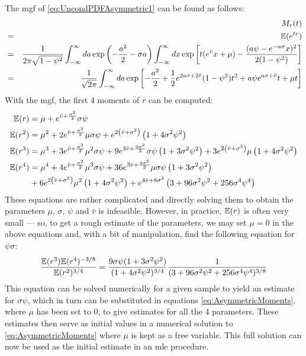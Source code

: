 The \gls{mgf} of \ref{eq:UncondPDFAsymmetric1} can be found as follows:
\begin{eqnarray*}
  && M_{r}(t) \\
  &=& \mathbb{E}(e^{tr}) \\
  &=& {1 \over 2\pi \sqrt{1 - \psi^2}} \int_{-\infty}^{\infty} da \exp \left(
    -{a^2 \over 2} - \sigma a
  \right) \int_{-\infty}^{\infty} dx \exp\left[
    t(e^{\bar{v}}x + \mu) - {
      (a\psi - e^{-a \sigma} x)^2 \over 2 (1 - \psi^2)
    }
  \right] \\
  &=& {1 \over \sqrt{2 \pi}} \int_{-\infty}^{\infty} da \exp\left[
    -{a^2 \over 2} + {1 \over 2} e^{2 a \sigma + 2\bar{v}} (1 - \psi^2) t^2 +
    a \psi e^{a \sigma + \bar{v}} t + \mu t
  \right]
\end{eqnarray*}
With the \gls{mgf}, the first 4 moments of $r$ can be computed:
\begin{equation}
  \label{eq:AsymmetricMoments}
  \begin{aligned}
    \mathbb{E}(r) &= \mu +e^{\bar{v}+\frac{\sigma ^2}{2}} \sigma  \psi\\
    \mathbb{E}(r^2) &= \mu ^2+2 e^{\bar{v}+\frac{\sigma ^2}{2}} \mu  \sigma  \psi
    +e^{2 \left(\bar{v}+\sigma ^2\right)} \left(1+4 \sigma ^2 \psi^2\right)\\
    \mathbb{E}(r^3) &= \mu ^3+3 e^{\bar{v}+\frac{\sigma ^2}{2}} \mu ^2 \sigma \psi
    +9 e^{3 \bar{v}+\frac{9 \sigma ^2}{2}} \sigma \psi \left(1+3 \sigma ^2
      \psi ^2\right)
    +3e^{2 \left(\bar{v}+\sigma ^2\right)} \mu  \left(1+4 \sigma ^2 \psi
      ^2\right) \\
    \mathbb{E}(r^4) &= \mu ^4+4 e^{\bar{v}+\frac{\sigma ^2}{2}} \mu ^3 \sigma  \psi
    +36 e^{3 \bar{v}+\frac{9 \sigma ^2}{2}} \mu  \sigma  \psi  \left(1+3
      \sigma ^2 \psi ^2\right)\\ 
    & +6 e^{2 \left(\bar{v}+\sigma ^2\right)} \mu ^2 \left(1+4 \sigma ^2 \psi
      ^2\right)
    +e^{4 \bar{v}+8 \sigma ^2} \left(3+96 \sigma ^2 \psi ^2+256 \sigma ^4
      \psi ^4\right)
  \end{aligned}
\end{equation}
These equations are rather complicated and directly solving them to
obtain the parameters $\mu$, $\sigma$, $\psi$ and $\bar{v}$ is
infeasible. However, in practice, $\mathbb{E}(r)$ is often very small --- so, to
get a rough estimate of the parameters, we may set $\mu = 0$ in the
above equations and, with a bit of manipulation, find the following
equation for $\psi\sigma$:
\begin{equation}
  \label{eq:moment1}
  { \mathbb{E} (r^3)  \mathbb{E} (r^4)^{-3/8} \over  \mathbb{E} (r^2)^{3/4}} =
  {9\sigma \psi (1 + 3\sigma^2\psi^2) \over (1 +
    4\sigma^2\psi^2)^{3/4}}
  {1
    \over
    (3 + 96\sigma^2\psi^2 + 256\sigma^4 \psi^4)^{3/8}
  }
\end{equation}
This equation can be solved numerically for a given sample to yield an
estimate for $\sigma\psi$, which in turn can be substituted in
equations \ref{eq:AsymmetricMoments}, where $\mu$ has been set to 0,
to give estimates for all the 4 parameters. These estimates then serve
as initial values in a numerical solution to
\ref{eq:AsymmetricMoments} where $\mu$ is kept as a free
variable. This full solution can now be used as the initial estimate
in an \gls{mle} procedure.

